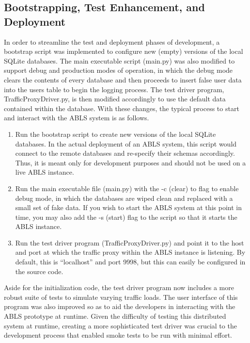 \documentclass{sig-alternate}
\begin{document}
\subsection{Bootstrapping, Test Enhancement, and Deployment}
In order to streamline the test and deployment phases of development, a bootstrap script was implemented to configure
new (empty) versions of the local SQLite databases. The main executable script (main.py) was also modified to support
debug and production modes of operation, in which the debug mode clears the contents of every database and
then proceeds to insert false user data into the users table to begin the logging process. The test driver program,
TrafficProxyDriver.py, is then modified accordingly to use the default data contained within the database. With these
changes, the typical process to start and interact with the ABLS system is as follows.

\begin{enumerate}
	\item Run the bootstrap script to create new versions of the local SQLite databases. In the actual deployment of an ABLS system, this script would connect to the remote databases and re-specify their schemas accordingly. Thus, it is meant only for development purposes and should not be used on a live ABLS instance.
	\item Run the main executable file (main.py) with the -c (clear) to flag to enable debug mode, in which the databases are wiped clean and replaced with a small set of fake data. If you wish to start the ABLS system at this point in time, you may also add the -s (start) flag to the script so that it starts the ABLS instance.
	\item Run the test driver program (TrafficProxyDriver.py) and point it to the host and port at which the traffic proxy within the ABLS instance is listening. By default, this is ``localhost'' and port 9998, but this can easily be configured in the source code. 
\end{enumerate}

Aside for the initialization code, the test driver program now includes a more robust suite of tests to simulate varying traffic 
loads. The user interface of this program was also improved so as to aid the developers in interacting with the ABLS 
prototype at runtime. Given the difficulty of testing this distributed system at runtime, creating a more sophisticated
test driver was crucial to the development process that enabled smoke tests to be run with minimal effort.
\end{document}
